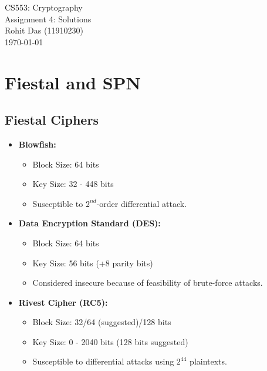 \documentclass[12pt]{article}
\begin{document}
\begin{titlepage}
\centering
\vspace*{\fill}
\huge CS553: Cryptography\\
\LARGE Assignment 4: Solutions\\
\Large Rohit Das (11910230)\\\vspace{0.8cm}
\today
\vspace*{\fill}
\end{titlepage}

\section{Fiestal and SPN}
\begin{large}
\subsection{Fiestal Ciphers}
\begin{itemize}[itemsep=-1ex, topsep=-1ex]
\item \textbf{Blowfish:}
	\begin{itemize}[itemsep=-2ex, topsep=-2ex]
	\item Block Size: 64 bits
	\item Key Size: 32 - 448 bits
	\item Susceptible to $2^{nd}$-order differential attack.
	\end{itemize}
	
\item \textbf{Data Encryption Standard (DES):}
	\begin{itemize}[itemsep=-2ex, topsep=-2ex]
	\item Block Size: 64 bits
	\item Key Size: 56 bits (+8 parity bits)
	\item Considered insecure because of feasibility of brute-force attacks.
	\end{itemize}
	
\item \textbf{Rivest Cipher (RC5):}
	\begin{itemize}[itemsep=-2ex, topsep=-2ex]
	\item Block Size: 32/64 (suggested)/128 bits
	\item Key Size: 0 - 2040 bits (128 bits suggested)
	\item Susceptible to differential attacks using $2^{44}$ plaintexts.
	\end{itemize}
	

\end{itemize}
\end{large}
\end{document}

